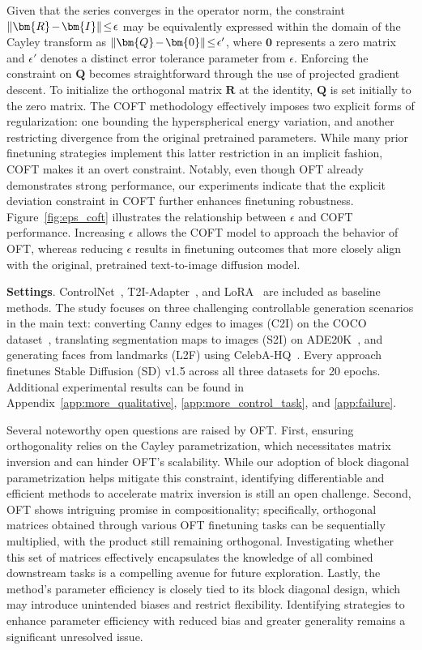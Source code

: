 Given that the series converges in the operator norm, the constraint $\thickmuskip=2mu \medmuskip=2mu\|\bm{R}-\bm{I}\|\leq\epsilon$ may be equivalently expressed within the domain of the Cayley transform as $\thickmuskip=2mu \medmuskip=2mu \|\bm{Q}-\bm{0}\|\leq\epsilon'$, where $\bm{0}$ represents a zero matrix and $\epsilon'$ denotes a distinct error tolerance parameter from $\epsilon$. Enforcing the constraint on $\bm{Q}$ becomes straightforward through the use of projected gradient descent. To initialize the orthogonal matrix $\bm{R}$ at the identity, $\bm{Q}$ is set initially to the zero matrix. The COFT methodology effectively imposes two explicit forms of regularization: one bounding the hyperspherical energy variation, and another restricting divergence from the original pretrained parameters. While many prior finetuning strategies implement this latter restriction in an implicit fashion, COFT makes it an overt constraint. Notably, even though OFT already demonstrates strong performance, our experiments indicate that the explicit deviation constraint in COFT further enhances finetuning robustness. Figure~\ref{fig:eps_coft} illustrates the relationship between $\epsilon$ and COFT performance. Increasing $\epsilon$ allows the COFT model to approach the behavior of OFT, whereas reducing $\epsilon$ results in finetuning outcomes that more closely align with the original, pretrained text-to-image diffusion model.

\textbf{Settings}. ControlNet~\cite{zhang2023adding}, T2I-Adapter~\cite{mou2023t2i}, and LoRA~\cite{hulora2022} are included as baseline methods. The study focuses on three challenging controllable generation scenarios in the main text: converting Canny edges to images (C2I) on the COCO dataset~\cite{lin2014microsoft}, translating segmentation maps to images (S2I) on ADE20K~\cite{zhou2017scene}, and generating faces from landmarks (L2F) using CelebA-HQ~\cite{karras2018progressive,xia2021tedigan}. Every approach finetunes Stable Diffusion (SD) v1.5 across all three datasets for 20 epochs. Additional experimental results can be found in Appendix~\ref{app:more_qualitative}, \ref{app:more_control_task}, and \ref{app:failure}.

Several noteworthy open questions are raised by OFT. First, ensuring orthogonality relies on the Cayley parametrization, which necessitates matrix inversion and can hinder OFT’s scalability. While our adoption of block diagonal parametrization helps mitigate this constraint, identifying differentiable and efficient methods to accelerate matrix inversion is still an open challenge. Second, OFT shows intriguing promise in compositionality; specifically, orthogonal matrices obtained through various OFT finetuning tasks can be sequentially multiplied, with the product still remaining orthogonal. Investigating whether this set of matrices effectively encapsulates the knowledge of all combined downstream tasks is a compelling avenue for future exploration. Lastly, the method’s parameter efficiency is closely tied to its block diagonal design, which may introduce unintended biases and restrict flexibility. Identifying strategies to enhance parameter efficiency with reduced bias and greater generality remains a significant unresolved issue.

